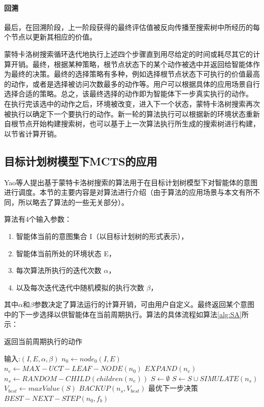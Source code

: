 \paragraph{回溯}
最后，在回溯阶段，上一阶段获得的最终评估值被反向传播至搜索树中所经历的每个节点以更新其相应的价值。

蒙特卡洛树搜索循环迭代地执行上述四个步骤直到用尽给定的时间或耗尽其它的计算开销。最终，根据某种策略，根节点状态下的某个动作被选中并返回给智能体作为最终的决策。最终的选择策略有多种，例如选择根节点状态下可执行的价值最高的动作，或者是选择被访问次数最多的动作等。用户可以根据具体的应用场景自行选择合适的策略。总之，该最终选择的动作即为智能体下一步真实执行的动作。
%
在执行完该选中的动作之后，环境被改变，进入下一个状态，蒙特卡洛树搜索再次被执行以确定下一个要执行的动作。新一轮的算法执行可以根据新的环境状态重新自根节点开始构建搜索树，也可以基于上一次算法执行所生成的搜索树进行构建，以节省计算开销。


\subsection{目标计划树模型下MCTS的应用}\label{SA}
Yao等人提出基于蒙特卡洛树搜索的\SA \cite{DBLP:conf/atal/YaoL16}算法用于在目标计划树模型下对智能体的意图进行调度。本节的主要内容是对\SA 算法进行介绍（由于\SA 算法的应用场景与本文有所不同，所以略去了算法的一些无关部分）。

\SA 算法有4个输入参数：
\begin{enumerate}
  \item 智能体当前的意图集合 I（以目标计划树的形式表示），
  \item 智能体当前所处的环境状态 E，
  \item 每次算法所执行的迭代次数 $\alpha$， 
  \item 以及每次迭代迭代中随机模拟的执行次数 $\beta$，
\end{enumerate}
其中$\alpha$和$\beta$参数决定了算法运行的计算开销，可由用户自定义。\SA 最终返回某个意图中的下一步选择以供智能体在当前周期执行。\SA 算法的具体流程如算法\ref{alg:SA}所示：

\begin{algorithm}
\caption{返回当前周期执行的动作}\label{alg:SA}
  \begin{algorithmic}[1]
    \STATE 输入:$(I, E,\alpha,\beta)$
    \STATE $n_0 \gets node_0(I,E)$ \label{root}
     \label{iteration begin}
      \STATE $n_e \gets MAX-UCT-LEAF-NODE(n_0)$ \label{selection}
      \STATE $EXPAND(n_e)$ \label{expansion}
      \STATE $n_s \gets RANDOM-CHILD(children(n_e))$ \label{simulation begin}
      \STATE $S \gets \emptyset$
        \STATE $S \gets S \cup SIMULATE(n_s)$
      \ENDFOR \label{simulation end}
      \STATE $V_{best} \gets maxValue(S)$
      \STATE $BACKUP(n_s, V_{best})$ \label{back}
      \ENDFOR \label{iteration end}
      \STATE \RETURN 最优下一步决策 $BEST-NEXT-STEP(n_0, f_b)$
  \end{algorithmic}
\end{algorithm}

